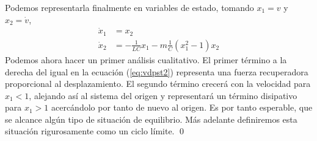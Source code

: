 \begin{example}
Podemos representarla finalmente en variables de estado, tomando $x_1=v$ y $x_2=\dot{v}$,
\begin{align}
\dot{x}_1 &= x_2 \label{eq:vpst1} \\
\dot{x}_2 &= -\frac{1}{LC}x_1 - m\frac{1}{C}(x_1^2-1)x_2 \label{eq:vdpst2}
\end{align}
Podemos ahora hacer un primer análisis cualitativo. El primer término a la derecha del igual en la ecuación (\ref{eq:vdpst2}) representa una fuerza recuperadora proporcional al desplazamiento. El segundo término crecerá con la velocidad para $x_1 < 1$, alejando así al sistema del origen y representará un término disipativo para $x_1 > 1$ acercándolo por tanto de nuevo al origen. Es por tanto esperable, que se alcance algún tipo de situación de equilibrio. Más adelante definiremos esta situación rigurosamente como un ciclo límite. \qed
\end{example} 
